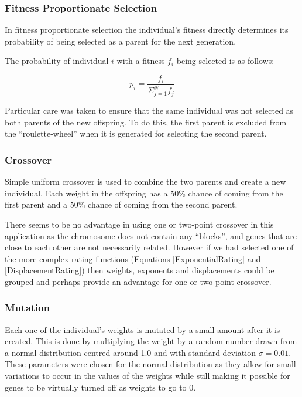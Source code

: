 \documentclass[a4paper,12pt]{article}
\begin{document}
\subsubsection{Fitness Proportionate Selection}

In fitness proportionate selection the individual's fitness directly determines
its probability of being selected as a parent for the next generation.

The probability of individual $i$ with a fitness $f_i$ being selected is as
follows:

\begin{equation}
  p_i = \frac{f_i}{\Sigma^N_{j=1} f_j}
\end{equation}

Particular care was taken to ensure that the same individual was not selected
as both parents of the new offspring.
To do this, the first parent is excluded from the ``roulette-wheel'' when it is
generated for selecting the second parent.

\subsubsection{Crossover}

Simple uniform crossover is used to combine the two parents and create a new
individual.
Each weight in the offspring has a 50\% chance of coming from the first parent
and a 50\% chance of coming from the second parent.

There seems to be no advantage in using one or two-point crossover in this
application as the chromosome does not contain any ``blocks'', and genes that
are close to each other are not necessarily related.
However if we had selected one of the more complex rating functions (Equations
\ref{ExponentialRating} and \ref{DisplacementRating}) then weights, exponents
and displacements could be grouped and perhaps provide an advantage for one or
two-point crossover.

\subsubsection{Mutation}

Each one of the individual's weights is mutated by a small amount after it is
created.
This is done by multiplying the weight by a random number drawn from a normal
distribution centred around 1.0 and with standard deviation $\sigma = 0.01$.
These parameters were chosen for the normal distribution as they allow for small
variations to occur in the values of the weights while still making it possible
for genes to be virtually turned off as weights to go to 0.
\end{document}

